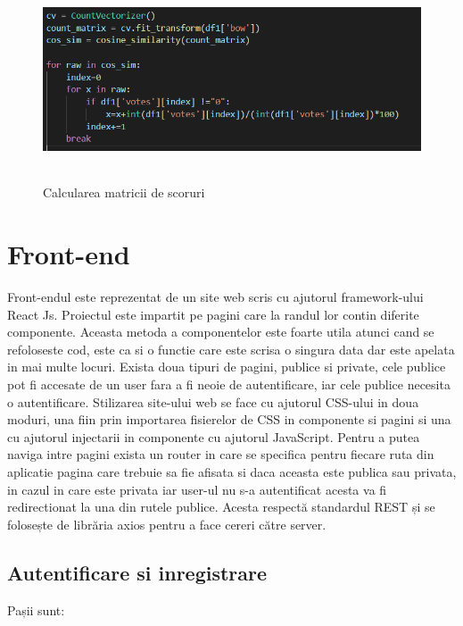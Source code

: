 \begin{figure}[!h]
			\centerline{\includegraphics[width=15cm, height=6cm]{figures/calculare scoruri.png}}
			\caption{Calcularea matricii de scoruri}
			\label{fig}
		\end{figure}

\section{Front-end}
\label{sec:ch5sec1}

\par Front-endul este reprezentat de un site web scris cu ajutorul framework-ului React Js. Proiectul este impartit pe pagini care la randul lor contin diferite componente. Aceasta metoda a componentelor este foarte utila atunci cand se refoloseste cod, este ca si o functie care este scrisa o singura data dar este apelata in mai multe locuri. Exista doua tipuri de pagini, publice si private, cele publice pot fi accesate de un user fara a fi neoie de autentificare, iar cele publice necesita o autentificare. Stilizarea site-ului web se face cu ajutorul CSS-ului in doua moduri, una fiin prin importarea fisierelor de CSS in componente si pagini si una cu ajutorul injectarii in componente cu ajutorul JavaScript. Pentru a putea naviga intre pagini exista un router in care se specifica pentru fiecare ruta din aplicatie pagina care trebuie sa fie afisata si daca aceasta este publica sau privata, in cazul in care este privata iar user-ul nu s-a autentificat acesta va fi redirectionat la una din rutele publice. Acesta respectă standardul REST și se folosește de librăria axios pentru a face cereri către server.

\subsection{Autentificare si inregistrare}
\par Pașii sunt:

